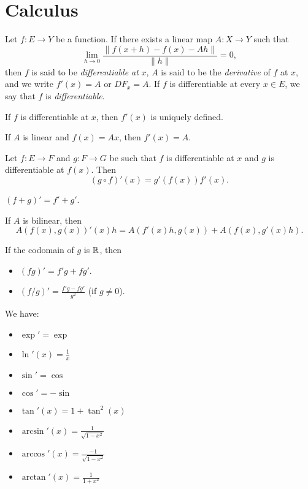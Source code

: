 \section{Calculus}
\begin{defn}
    Let $f:E\to Y$ be a function. If there exists a linear map $A:X\to Y$ such that
    \[\lim_{h\to 0}\frac{\|f(x+h)-f(x)-Ah\|}{\|h\|}=0,\]
    then $f$ is said to be \emph{differentiable at} $x$, $A$ is said to be the
    \emph{derivative} of $f$ at $x$, and we write $f'(x)=A$ or $DF_x=A$.
    If $f$ is differentiable at every $x\in E$, we say that $f$ is
    \emph{differentiable}.
\end{defn}
\begin{prop}
    If $f$ is differentiable at $x$, then $f'(x)$ is uniquely defined.
\end{prop}
\begin{prop}
    If $A$ is linear and $f(x)=Ax$, then $f'(x)=A$.
\end{prop}
\begin{prop}
    Let $f:E\to F$ and $g:F\to G$ be such that $f$ is differentiable at $x$ and $g$
    is differentiable at $f(x)$. Then \[(g\circ f)'(x)=g'(f(x))f'(x).\]
\end{prop}
\begin{prop}
    $(f+g)'=f'+g'$.
\end{prop}
\begin{prop}
    If $A$ is bilinear, then
    \[A(f(x),g(x))'(x)h=A(f'(x)h,g(x))+A(f(x),g'(x)h).\]
\end{prop}
\begin{cor}
    If the codomain of $g$ is $\mathbb{R}$, then
    \begin{itemize}
        \item $(fg)'=f'g+fg'$.
        \item $(f/g)'=\frac{f'g-fg'}{g^2}$ (if $g\ne 0$).
    \end{itemize}
\end{cor}
\begin{prop}
    We have:
    \begin{itemize}
        \item $\exp'=\exp$
        \item $\ln'(x)=\frac 1x$
        \item $\sin'=\cos$
        \item $\cos'=-\sin$
        \item $\tan'(x)=1+\tan^2(x)$
        \item $\arcsin'(x)=\frac 1{\sqrt{1-x^2}}$
        \item $\arccos'(x)=\frac{-1}{\sqrt{1-x^2}}$
        \item $\arctan'(x)=\frac 1{1+x^2}$
    \end{itemize}
\end{prop}
